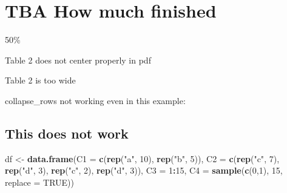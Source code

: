 \documentclass[
]{book}
\newenvironment{Shaded}{\begin{snugshade}}{\end{snugshade}}
\newcommand{\DataTypeTok}[1]{\textcolor[rgb]{0.13,0.29,0.53}{#1}}
\newcommand{\DecValTok}[1]{\textcolor[rgb]{0.00,0.00,0.81}{#1}}
\newcommand{\KeywordTok}[1]{\textcolor[rgb]{0.13,0.29,0.53}{\textbf{#1}}}
\newcommand{\NormalTok}[1]{#1}
\newcommand{\OperatorTok}[1]{\textcolor[rgb]{0.81,0.36,0.00}{\textbf{#1}}}
\newcommand{\OtherTok}[1]{\textcolor[rgb]{0.56,0.35,0.01}{#1}}
\newcommand{\StringTok}[1]{\textcolor[rgb]{0.31,0.60,0.02}{#1}}
\begin{document}
\hypertarget{standalone-cad-radiologists-how-much-finished}{%
\section{TBA How much finished}\label{standalone-cad-radiologists-how-much-finished}}

50\%

Table 2 does not center properly in pdf

Table 2 is too wide

collapse\_rows not working even in this example:

\hypertarget{this-does-not-work}{%
\subsection{This does not work}\label{this-does-not-work}}

\begin{Shaded}
\begin{Highlighting}[]
\NormalTok{df <-}\StringTok{ }\KeywordTok{data.frame}\NormalTok{(}\DataTypeTok{C1 =} \KeywordTok{c}\NormalTok{(}\KeywordTok{rep}\NormalTok{(}\StringTok{"a"}\NormalTok{, }\DecValTok{10}\NormalTok{), }\KeywordTok{rep}\NormalTok{(}\StringTok{"b"}\NormalTok{, }\DecValTok{5}\NormalTok{)),}
                 \DataTypeTok{C2 =} \KeywordTok{c}\NormalTok{(}\KeywordTok{rep}\NormalTok{(}\StringTok{"c"}\NormalTok{, }\DecValTok{7}\NormalTok{), }\KeywordTok{rep}\NormalTok{(}\StringTok{"d"}\NormalTok{, }\DecValTok{3}\NormalTok{), }\KeywordTok{rep}\NormalTok{(}\StringTok{"c"}\NormalTok{, }\DecValTok{2}\NormalTok{), }\KeywordTok{rep}\NormalTok{(}\StringTok{"d"}\NormalTok{, }\DecValTok{3}\NormalTok{)),}
                 \DataTypeTok{C3 =} \DecValTok{1}\OperatorTok{:}\DecValTok{15}\NormalTok{,}
                 \DataTypeTok{C4 =} \KeywordTok{sample}\NormalTok{(}\KeywordTok{c}\NormalTok{(}\DecValTok{0}\NormalTok{,}\DecValTok{1}\NormalTok{), }\DecValTok{15}\NormalTok{, }\DataTypeTok{replace =} \OtherTok{TRUE}\NormalTok{))}
\end{Highlighting}
\end{Shaded}

\begin{Shaded}
\end{Shaded}
\end{document}
